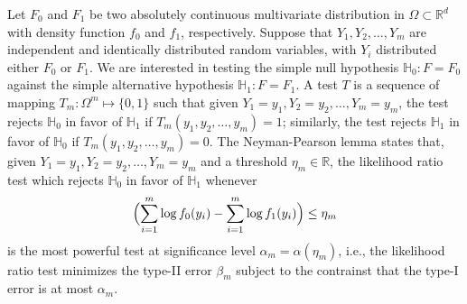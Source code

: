 \documentclass[10pt]{article}
\begin{document}
Let $F_0$ and $F_1$ be two absolutely continuous multivariate distribution in $\Omega \subset \mathbb{R}^{d}$ with density function $f_0$ and $f_1$, respectively. Suppose that $Y_1, Y_2, \dots, Y_m$ are independent and identically distributed random variables, with $Y_i$ distributed either $F_0$ or $F_1$. We are interested in testing the simple null hypothesis $\mathbb{H}_0 \colon F = F_0$ against the simple alternative hypothesis $\mathbb{H}_1 \colon F = F_1$. A test $T$ is a sequence of mapping $T_m \colon \Omega^{m} \mapsto \{0,1\}$ such that given $Y_1 = y_1, Y_2 = y_2, \dots, Y_m = y_m$, the test rejects $\mathbb{H}_0$ in favor of $\mathbb{H}_1$ if $T_m(y_1, y_2, \dots, y_m) = 1$; similarly, the test rejects $\mathbb{H}_1$ in favor of $\mathbb{H}_0$ if $T_m(y_1, y_2, \dots, y_m) = 0$. 
The Neyman-Pearson lemma states that, given $Y_1 = y_1, Y_2 = y_2, \dots, Y_m = y_m$ and a threshold $\eta_m \in \mathbb{R}$, the likelihood ratio test which rejects $\mathbb{H}_0$ in favor of $\mathbb{H}_1$ whenever
$$ \Bigl(\sum_{i=1}^{m} \log{f_0(y_i)} - \sum_{i=1}^{m} \log{f_1(y_i)} \Bigr) \leq \eta_m $$
is the most powerful test at significance level $\alpha_m = \alpha(\eta_m)$, i.e., the likelihood ratio test minimizes the type-II error $\beta_m$ subject to the contrainst that the type-I error is at most $\alpha_m$. 
\end{document}
